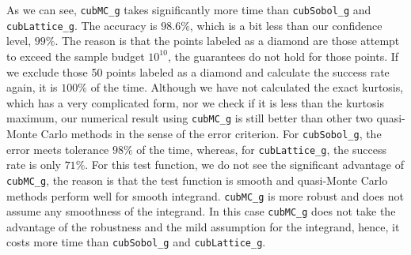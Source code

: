 \documentclass{iitthesis}
\theoremstyle{definition}
\begin{document}
As we can see,  {\tt cubMC\_g} takes significantly more time than {\tt cubSobol\_g} and {\tt cubLattice\_g}. The accuracy is $98.6\%$, which is a bit less than our confidence level, $99\%$. The reason is that the points labeled as a diamond are those attempt to exceed the sample budget $10^{10}$,  the guarantees do not hold for those points. If we exclude those 50 points labeled as a diamond and calculate the success rate again, it is $100\%$ of the time. Although we have not calculated the exact kurtosis, which has a very complicated form, nor we check if it is less than the kurtosis maximum, our numerical result using {\tt cubMC\_g} is still better than other two quasi-Monte Carlo methods in the sense of the error criterion. For {\tt cubSobol\_g}, the error meets tolerance $98\%$ of the time, whereas, for  {\tt cubLattice\_g}, the success rate is only $71\%$.  For this test function, we do not see the significant advantage of {\tt cubMC\_g}, the reason is that the test function is smooth and quasi-Monte Carlo methods perform well for smooth integrand. {\tt cubMC\_g} is more robust and does not assume any smoothness of the integrand. In this case {\tt cubMC\_g} does not take the advantage of the robustness and the mild assumption for the integrand, hence, it costs more time  than {\tt cubSobol\_g} and {\tt cubLattice\_g}.
\end{document}
